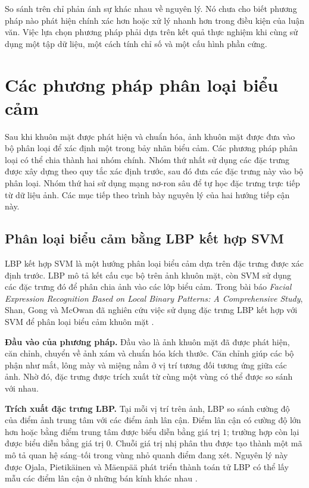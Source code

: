 \documentclass[../LuanVan.tex]{subfiles}
\begin{document}
So sánh trên chỉ phản ánh sự khác nhau về nguyên lý. Nó chưa cho biết phương pháp nào phát hiện chính xác hơn hoặc xử lý nhanh hơn trong điều kiện của luận văn. Việc lựa chọn phương pháp phải dựa trên kết quả thực nghiệm khi cùng sử dụng một tập dữ liệu, một cách tính chỉ số và một cấu hình phần cứng.

\section{Các phương pháp phân loại biểu cảm}
\label{section:2.3}

Sau khi khuôn mặt được phát hiện và chuẩn hóa, ảnh khuôn mặt được đưa vào bộ phân loại để xác định một trong bảy nhãn biểu cảm. Các phương pháp phân loại có thể chia thành hai nhóm chính. Nhóm thứ nhất sử dụng các đặc trưng được xây dựng theo quy tắc xác định trước, sau đó đưa các đặc trưng này vào bộ phân loại. Nhóm thứ hai sử dụng mạng nơ-ron sâu để tự học đặc trưng trực tiếp từ dữ liệu ảnh. Các mục tiếp theo trình bày nguyên lý của hai hướng tiếp cận này.

\subsection{Phân loại biểu cảm bằng LBP kết hợp SVM}
\label{subsection:2.3.1}

LBP kết hợp SVM là một hướng phân loại biểu cảm dựa trên đặc trưng được xác định trước. LBP mô tả kết cấu cục bộ trên ảnh khuôn mặt, còn SVM sử dụng các đặc trưng đó để phân chia ảnh vào các lớp biểu cảm. Trong bài báo \textit{Facial Expression Recognition Based on Local Binary Patterns: A Comprehensive Study}, Shan, Gong và McOwan đã nghiên cứu việc sử dụng đặc trưng LBP kết hợp với SVM để phân loại biểu cảm khuôn mặt \cite{shan2009lbp}.

\noindent\textbf{Đầu vào của phương pháp.} Đầu vào là ảnh khuôn mặt đã được phát hiện, căn chỉnh, chuyển về ảnh xám và chuẩn hóa kích thước. Căn chỉnh giúp các bộ phận như mắt, lông mày và miệng nằm ở vị trí tương đối tương ứng giữa các ảnh. Nhờ đó, đặc trưng được trích xuất từ cùng một vùng có thể được so sánh với nhau.

\noindent\textbf{Trích xuất đặc trưng LBP.} Tại mỗi vị trí trên ảnh, LBP so sánh cường độ của điểm ảnh trung tâm với các điểm ảnh lân cận. Điểm lân cận có cường độ lớn hơn hoặc bằng điểm trung tâm được biểu diễn bằng giá trị $1$; trường hợp còn lại được biểu diễn bằng giá trị $0$. Chuỗi giá trị nhị phân thu được tạo thành một mã mô tả quan hệ sáng--tối trong vùng nhỏ quanh điểm đang xét. Nguyên lý này được Ojala, Pietikäinen và Mäenpää phát triển thành toán tử LBP có thể lấy mẫu các điểm lân cận ở những bán kính khác nhau \cite{ojala2002lbp}.
\end{document}
